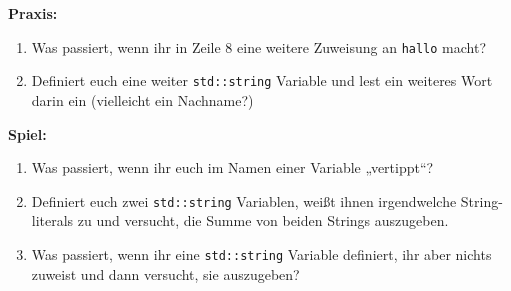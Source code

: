 \textbf{Praxis:}
\begin{enumerate}
    \item Was passiert, wenn ihr in Zeile 8 eine weitere Zuweisung an
        \texttt{hallo} macht?
    \item Definiert euch eine weiter \texttt{std::string} Variable und lest ein
        weiteres Wort darin ein (vielleicht ein Nachname?)
\end{enumerate}

\textbf{Spiel:}
\begin{enumerate}
    \item Was passiert, wenn ihr euch im Namen einer Variable „vertippt“?
    \item Definiert euch zwei \texttt{std::string} Variablen, weißt ihnen
        irgendwelche String-literals zu und versucht, die Summe von beiden
        Strings auszugeben.
    \item Was passiert, wenn ihr eine \texttt{std::string} Variable definiert,
        ihr aber nichts zuweist und dann versucht, sie auszugeben?
\end{enumerate}
